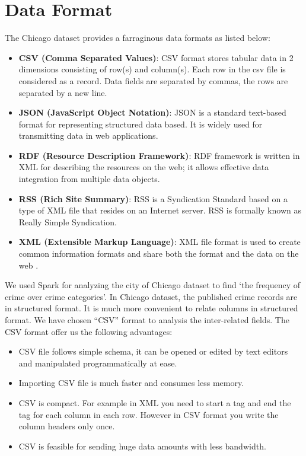 \section{Data Format}

The Chicago dataset provides a farraginous data formats as listed below:
\begin{itemize}
    \item \textbf{CSV (Comma Separated Values)}: CSV format stores tabular data in 2 dimensions consisting of row(s) and column(s). Each row in the csv file is considered as a record. Data fields are separated by commas, the rows are separated by a new line\cite{csv}.
    \item \textbf{JSON (JavaScript Object Notation)}: JSON is a standard text-based format for representing structured data based. It is widely used for transmitting data in web applications\cite{json}.
    \item \textbf{RDF (Resource Description Framework)}: RDF framework is written in XML for describing the resources on the web; it allows effective data integration from multiple data objects\cite{rdf}.
    \item \textbf{RSS (Rich Site Summary)}: RSS is a Syndication Standard based on a type of XML file that resides on an Internet server. RSS is formally known as Really Simple Syndication\cite{rss}.
    \item \textbf{XML (Extensible Markup Language)}: XML file format is used to create common information formats and share both the format and the data on the web \cite{xml}.
\end{itemize}

We used Spark for analyzing the city of Chicago dataset to find ‘the frequency of crime over crime categories’. In Chicago dataset, the published crime records are in structured format. It is much more convenient to relate columns in structured format. We have chosen “CSV” format to analysis the inter-related fields.\newline
The CSV format offer us the following advantages\cite{csv_advantage}:
\begin{itemize}
    \item CSV file follows simple schema, it can be opened or edited by text editors and manipulated programmatically at ease.
    \item Importing CSV file is much faster and consumes less memory.
    \item CSV is compact. For example in XML you need to start a tag and end the tag for each column in each row. However in CSV format you write the column headers only once.
    \item CSV is feasible for sending huge data amounts with less bandwidth.
\end{itemize}

